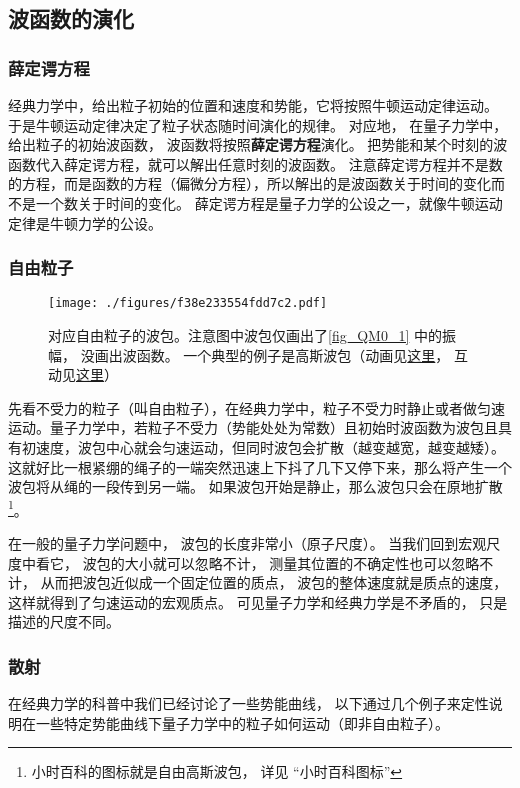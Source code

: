 \subsection{波函数的演化}
\subsubsection{薛定谔方程}
经典力学中，给出粒子初始的位置和速度和势能，它将按照牛顿运动定律运动。 于是牛顿运动定律决定了粒子状态随时间演化的规律。 对应地， 在量子力学中， 给出粒子的初始波函数， 波函数将按照\textbf{薛定谔方程}演化。 把势能和某个时刻的波函数代入薛定谔方程，就可以解出任意时刻的波函数。 注意薛定谔方程并不是数的方程，而是函数的方程（偏微分方程），所以解出的是波函数关于时间的变化而不是一个数关于时间的变化。 薛定谔方程是量子力学的公设之一，就像牛顿运动定律是牛顿力学的公设。

\subsubsection{自由粒子}

\begin{figure}[ht]
\centering
\texttt{[image: ./figures/f38e233554fdd7c2.pdf]}
\caption{对应自由粒子的波包。注意图中波包仅画出了\autoref{fig_QM0_1} 中的振幅， 没画出波函数。 一个典型的例子是高斯波包（动画见\href{https://wuli.wiki/apps/free_gauss.html}{这里}， 互动见\href{https://wuli.wiki/apps/gausWP.html}{这里}）} \label{fig_QM0_2}
\end{figure}

先看不受力的粒子（叫自由粒子），在经典力学中，粒子不受力时静止或者做匀速运动。量子力学中，若粒子不受力（势能处处为常数）且初始时波函数为波包且具有初速度，波包中心就会匀速运动，但同时波包会扩散（越变越宽，越变越矮）。这就好比一根紧绷的绳子的一端突然迅速上下抖了几下又停下来，那么将产生一个波包将从绳的一段传到另一端。 如果波包开始是静止，那么波包只会在原地扩散\footnote{小时百科的图标就是自由高斯波包， 详见 “小时百科图标”}。

在一般的量子力学问题中， 波包的长度非常小（原子尺度）。 当我们回到宏观尺度中看它， 波包的大小就可以忽略不计， 测量其位置的不确定性也可以忽略不计， 从而把波包近似成一个固定位置的质点， 波包的整体速度就是质点的速度， 这样就得到了匀速运动的宏观质点。 可见量子力学和经典力学是不矛盾的， 只是描述的尺度不同。

\subsubsection{散射}
在经典力学的科普中我们已经讨论了一些势能曲线， 以下通过几个例子来定性说明在一些特定势能曲线下量子力学中的粒子如何运动（即非自由粒子）。

